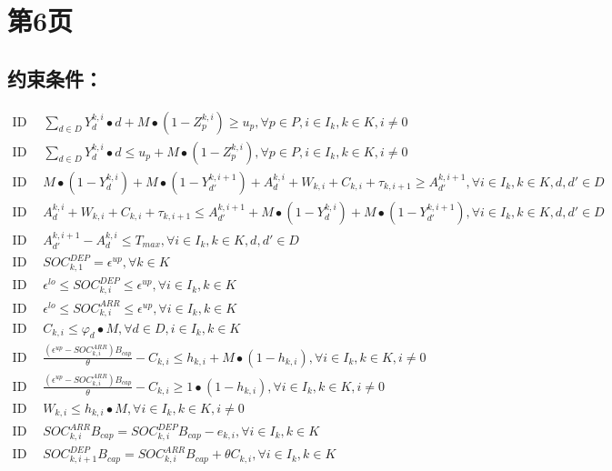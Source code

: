 \documentclass[11pt]{ctexart}
\begin{document}
\section*{第6页}

\subsection*{约束条件：}
\begin{align}
    \text{ID 12: } & \sum_{d \in D} Y_{d}^{k,i} \bullet d + M \bullet (1 - Z_{p}^{k,i}) \geq u_p, \forall p \in P, i \in I_k, k \in K, i \neq 0 \tag{12} \\
    \text{ID 13: } & \sum_{d \in D} Y_{d}^{k,i} \bullet d \leq u_p + M \bullet (1 - Z_{p}^{k,i}), \forall p \in P, i \in I_k, k \in K, i \neq 0 \tag{13} \\
    \text{ID 14: } & M \bullet (1 - Y_{d}^{k,i}) + M \bullet (1 - Y_{d'}^{k,i+1}) + A_{d}^{k,i} + W_{k,i} + C_{k,i} + \tau_{k,i+1} \geq A_{d'}^{k,i+1}, \forall i \in I_k, k \in K, d, d' \in D \tag{14} \\
    \text{ID 15: } & A_{d}^{k,i} + W_{k,i} + C_{k,i} + \tau_{k,i+1} \leq A_{d'}^{k,i+1} + M \bullet (1 - Y_{d}^{k,i}) + M \bullet (1 - Y_{d'}^{k,i+1}), \forall i \in I_k, k \in K, d, d' \in D \tag{15} \\
    \text{ID 16: } & A_{d'}^{k,i+1} - A_{d}^{k,i} \leq T_{max}, \forall i \in I_k, k \in K, d, d' \in D \tag{16} \\
    \text{ID 17: } & SOC_{k,1}^{DEP} = \epsilon^{up}, \forall k \in K \tag{17} \\
    \text{ID 18: } & \epsilon^{lo} \leq SOC_{k,i}^{DEP} \leq \epsilon^{up}, \forall i \in I_k, k \in K \tag{18} \\
    \text{ID 19: } & \epsilon^{lo} \leq SOC_{k,i}^{ARR} \leq \epsilon^{up}, \forall i \in I_k, k \in K \tag{19} \\
    \text{ID 20: } & C_{k,i} \leq \varphi_d \bullet M, \forall d \in D, i \in I_k, k \in K \tag{20} \\
    \text{ID 21: } & \frac{(\epsilon^{up} - SOC_{k,i}^{ARR})B_{cap}}{\theta} - C_{k,i} \leq h_{k,i} + M \bullet (1 - h_{k,i}), \forall i \in I_k, k \in K, i \neq 0 \tag{21} \\
    \text{ID 22: } & \frac{(\epsilon^{up} - SOC_{k,i}^{ARR})B_{cap}}{\theta} - C_{k,i} \geq 1 \bullet (1 - h_{k,i}), \forall i \in I_k, k \in K, i \neq 0 \tag{22} \\
    \text{ID 23: } & W_{k,i} \leq h_{k,i} \bullet M, \forall i \in I_k, k \in K, i \neq 0 \tag{23} \\
    \text{ID 24: } & SOC_{k,i}^{ARR} B_{cap} = SOC_{k,i}^{DEP} B_{cap} - e_{k,i}, \forall i \in I_k, k \in K \tag{24} \\
    \text{ID 25: } & SOC_{k,i+1}^{DEP} B_{cap} = SOC_{k,i}^{ARR} B_{cap} + \theta C_{k,i}, \forall i \in I_k, k \in K \tag{25}
\end{align}
\end{document}
